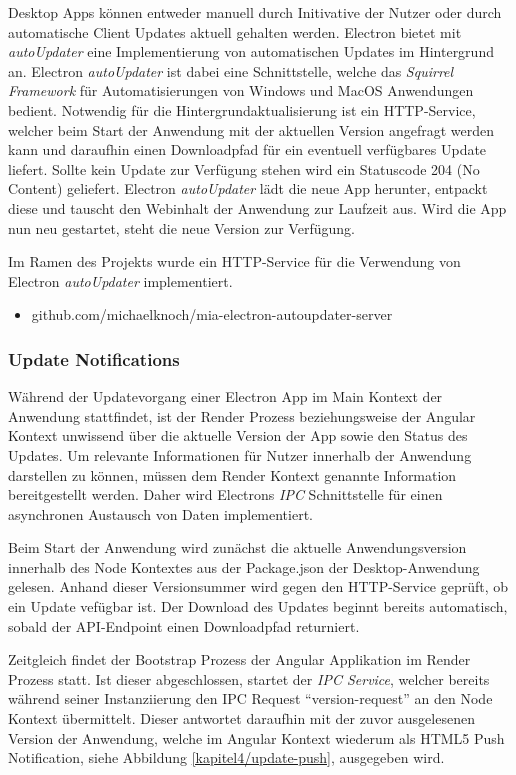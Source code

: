 Desktop Apps können entweder manuell durch Initivative der Nutzer oder durch
automatische Client Updates aktuell gehalten werden.
Electron bietet mit \emph{autoUpdater} eine Implementierung
von automatischen Updates im Hintergrund an.
Electron \emph{autoUpdater} ist dabei eine Schnittstelle, welche das \emph{Squirrel Framework}
für Automatisierungen von Windows und MacOS Anwendungen bedient.
Notwendig für die Hintergrundaktualisierung ist ein HTTP-Service, welcher beim Start der Anwendung mit der
aktuellen Version angefragt werden kann
und daraufhin einen Downloadpfad für ein eventuell verfügbares Update liefert.
Sollte kein Update zur Verfügung stehen wird ein Statuscode 204 (No Content) geliefert.
Electron \emph{autoUpdater} lädt die neue App herunter, entpackt diese und tauscht den Webinhalt der Anwendung zur Laufzeit aus.
Wird die App nun neu gestartet, steht die neue Version zur Verfügung.

Im Ramen des Projekts \projectname{} wurde ein HTTP-Service für die
Verwendung von Electron \emph{autoUpdater} implementiert.
\begin{itemize}
\item github.com/michaelknoch/mia-electron-autoupdater-server
\end{itemize}

\subsubsection{Update Notifications}

Während der Updatevorgang einer Electron App im Main Kontext der
Anwendung stattfindet, ist der Render Prozess beziehungsweise der Angular Kontext unwissend über die aktuelle
Version der App sowie den Status des Updates. Um relevante Informationen für Nutzer innerhalb der Anwendung darstellen zu können,
müssen dem Render Kontext genannte Information bereitgestellt werden.
Daher wird Electrons \emph{IPC} Schnittstelle für einen asynchronen Austausch von Daten implementiert.

Beim Start der Anwendung wird zunächst die aktuelle Anwendungsversion innerhalb des Node Kontextes aus der Package.json der Desktop-Anwendung gelesen.
Anhand dieser Versionsummer wird gegen den HTTP-Service geprüft, ob ein Update vefügbar ist. Der Download des Updates beginnt bereits automatisch,
sobald der API-Endpoint einen Downloadpfad returniert.

Zeitgleich findet der Bootstrap Prozess der Angular Applikation im Render Prozess statt.
Ist dieser abgeschlossen, startet der \emph{IPC Service}, welcher bereits während seiner Instanziierung den
IPC Request ``version-request'' an den Node Kontext übermittelt.
Dieser antwortet daraufhin mit der zuvor ausgelesenen Version der Anwendung, welche im Angular Kontext wiederum als HTML5 Push Notification, siehe Abbildung \ref{kapitel4/update-push}, ausgegeben wird.

